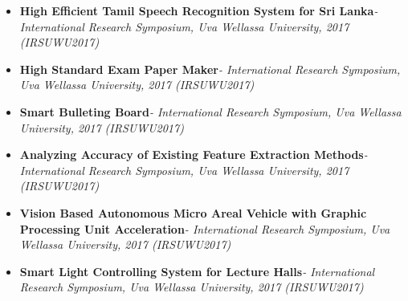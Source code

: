 \documentclass[11pt,a4paper,scan]{moderncv}        %
\begin{document}
\begin{itemize}
	\item {\textbf{High Efficient Tamil Speech Recognition System for Sri Lanka}\textit{- International Research Symposium, Uva Wellassa University, 2017 (IRSUWU2017)}}
	\vspace{6pt}
	
	\item {\textbf{High Standard Exam Paper Maker}\textit{- International Research Symposium, Uva Wellassa University, 2017 (IRSUWU2017)}}
	\vspace{6pt}
	
	\item {\textbf{Smart Bulleting Board}\textit{- International Research Symposium, Uva Wellassa University, 2017 (IRSUWU2017)}}
	\vspace{6pt}
	
	\item {\textbf{Analyzing Accuracy of Existing Feature Extraction Methods}\textit{- International Research Symposium, Uva Wellassa University, 2017 (IRSUWU2017)}}
	\vspace{6pt}
	
	\item {\textbf{Vision Based Autonomous Micro Areal Vehicle with Graphic Processing Unit Acceleration}\textit{- International Research Symposium, Uva Wellassa University, 2017 (IRSUWU2017)}}
	\vspace{6pt}
	
	\item {\textbf{Smart Light Controlling System for Lecture Halls}\textit{- International Research Symposium, Uva Wellassa University, 2017 (IRSUWU2017)}}
	\vspace{6pt}
	
	
\end{itemize}



%
%  





\end{document}
